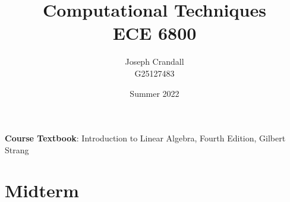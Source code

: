 
\usepackage{algorithm, algpseudocode, bm, color, gensymb, listings, siunitx, soul, subfiles, verbatim}
\usepackage[a4paper, total={7.5in, 10in}]{geometry}

\title{Computational Techniques\\
\large ECE 6800}
\author{Joseph Crandall\\
G25127483}
\date{Summer 2022}


\maketitle

\textbf{Course Textbook}: Introduction to Linear Algebra, Fourth Edition, Gilbert Strang

\begin{comment}

\section{Lecture 1}


\section{Hw 1}


\section{Lecture 2}


\section{Hw 2}


\section{Lecture 3}


\section{HW 3}


\section{Lecture 4}


\section{HW 4}


\end{comment}

\section{Midterm}


\begin{comment}

\end{comment}

